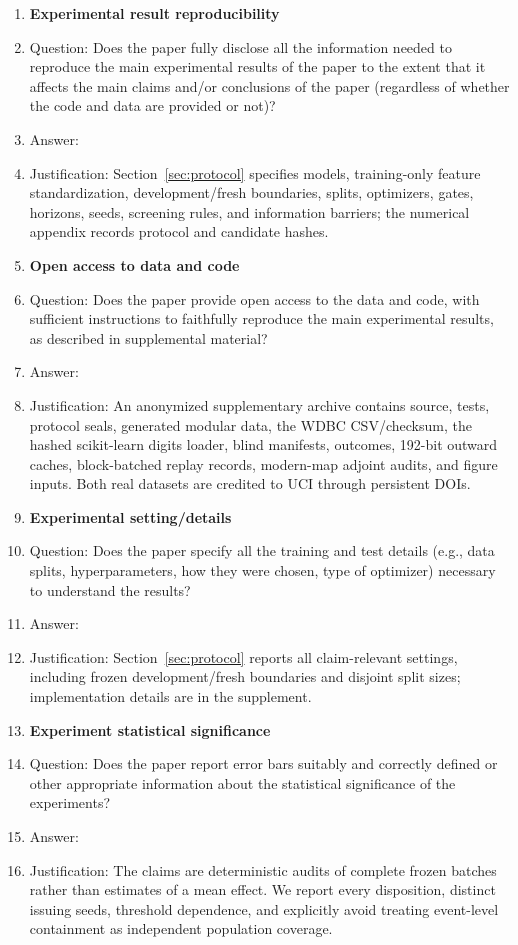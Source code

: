 \begin{enumerate}
\item {\bf Experimental result reproducibility}
    \item[] Question: Does the paper fully disclose all the information needed to reproduce the main experimental results of the paper to the extent that it affects the main claims and/or conclusions of the paper (regardless of whether the code and data are provided or not)?
    \item[] Answer: \answerYes{}
    \item[] Justification: Section~\ref{sec:protocol} specifies models, training-only feature standardization, development/fresh boundaries, splits, optimizers, gates, horizons, seeds, screening rules, and information barriers; the numerical appendix records protocol and candidate hashes.

\item {\bf Open access to data and code}
    \item[] Question: Does the paper provide open access to the data and code, with sufficient instructions to faithfully reproduce the main experimental results, as described in supplemental material?
    \item[] Answer: \answerYes{}
    \item[] Justification: An anonymized supplementary archive contains source, tests, protocol seals, generated modular data, the WDBC CSV/checksum, the hashed scikit-learn digits loader, blind manifests, outcomes, 192-bit outward caches, block-batched replay records, modern-map adjoint audits, and figure inputs. Both real datasets are credited to UCI through persistent DOIs.

\item {\bf Experimental setting/details}
    \item[] Question: Does the paper specify all the training and test details (e.g., data splits, hyperparameters, how they were chosen, type of optimizer) necessary to understand the results?
    \item[] Answer: \answerYes{}
    \item[] Justification: Section~\ref{sec:protocol} reports all claim-relevant settings, including frozen development/fresh boundaries and disjoint split sizes; implementation details are in the supplement.

\item {\bf Experiment statistical significance}
    \item[] Question: Does the paper report error bars suitably and correctly defined or other appropriate information about the statistical significance of the experiments?
    \item[] Answer: \answerYes{}
    \item[] Justification: The claims are deterministic audits of complete frozen batches rather than estimates of a mean effect. We report every disposition, distinct issuing seeds, threshold dependence, and explicitly avoid treating event-level containment as independent population coverage.


\end{enumerate}

